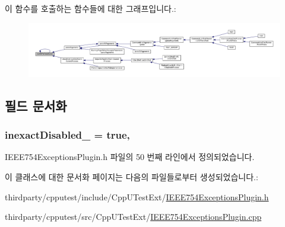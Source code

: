 이 함수를 호출하는 함수들에 대한 그래프입니다.\+:
\nopagebreak
\begin{figure}[H]
\begin{center}
\leavevmode
\includegraphics[width=350pt]{class_test_plugin_aa3524b10b0f1613104fa75f1c1a72cf6_icgraph}
\end{center}
\end{figure}




\subsection{필드 문서화}
\subsubsection[{\texorpdfstring{inexact\+Disabled\+\_\+}{inexactDisabled_}}]{ inexact\+Disabled\+\_\+ = {\bf true}\hspace{0.3cm}{\ttfamily [static]}, {\ttfamily [private]}}\hypertarget{class_i_e_e_e754_exceptions_plugin_add7e7034ccd8b650be51bae240e46cc6}{}\label{class_i_e_e_e754_exceptions_plugin_add7e7034ccd8b650be51bae240e46cc6}


I\+E\+E\+E754\+Exceptions\+Plugin.\+h 파일의 50 번째 라인에서 정의되었습니다.



이 클래스에 대한 문서화 페이지는 다음의 파일들로부터 생성되었습니다.\+:\begin{DoxyCompactItemize}
\item 
thirdparty/cpputest/include/\+Cpp\+U\+Test\+Ext/\hyperlink{_i_e_e_e754_exceptions_plugin_8h}{I\+E\+E\+E754\+Exceptions\+Plugin.\+h}\item 
thirdparty/cpputest/src/\+Cpp\+U\+Test\+Ext/\hyperlink{_i_e_e_e754_exceptions_plugin_8cpp}{I\+E\+E\+E754\+Exceptions\+Plugin.\+cpp}\end{DoxyCompactItemize}
